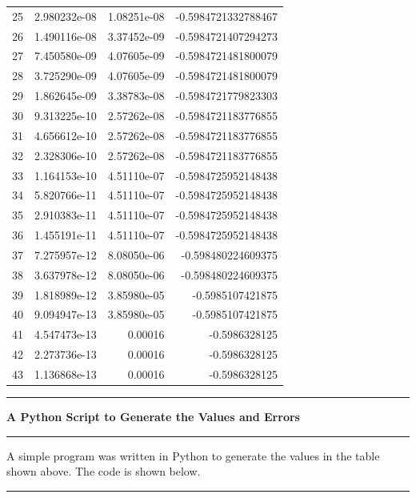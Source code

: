 \documentclass[10pt,fleqn]{article}
\begin{document}
\begin{tabular}{r|r|r|r|}
  25 &  2.980232e-08 & 1.08251e-08 &  -0.5984721332788467  \\
  26 &  1.490116e-08 & 3.37452e-09 &  -0.5984721407294273  \\
  27 &  7.450580e-09 & 4.07605e-09 &  -0.5984721481800079  \\
  28 &  3.725290e-09 & 4.07605e-09 &  -0.5984721481800079  \\
  29 &  1.862645e-09 & 3.38783e-08 &  -0.5984721779823303  \\
  30 &  9.313225e-10 & 2.57262e-08 &  -0.5984721183776855  \\
  31 &  4.656612e-10 & 2.57262e-08 &  -0.5984721183776855  \\
  32 &  2.328306e-10 & 2.57262e-08 &  -0.5984721183776855  \\
  33 &  1.164153e-10 & 4.51110e-07 &  -0.5984725952148438  \\
  34 &  5.820766e-11 & 4.51110e-07 &  -0.5984725952148438  \\
  35 &  2.910383e-11 & 4.51110e-07 &  -0.5984725952148438  \\
  36 &  1.455191e-11 & 4.51110e-07 &  -0.5984725952148438  \\
  37 &  7.275957e-12 & 8.08050e-06 &  -0.598480224609375   \\
  38 &  3.637978e-12 & 8.08050e-06 &  -0.598480224609375   \\
  39 &  1.818989e-12 & 3.85980e-05 &  -0.5985107421875     \\
  40 &  9.094947e-13 & 3.85980e-05 &  -0.5985107421875     \\
  41 &  4.547473e-13 & 0.00016     &  -0.5986328125        \\
  42 &  2.273736e-13 & 0.00016     &  -0.5986328125        \\
  43 &  1.136868e-13 & 0.00016     &  -0.5986328125        \\
\hline
\end{tabular}
\vskip0.1in\hrule\vskip0.1in \noindent
{\bf A Python Script to Generate the Values and Errors}
\vskip0.1in\hrule\vskip0.1in \noindent
A simple program was written in Python to generate the values in the table shown
above. The code is shown below.
\vskip0.1in\hrule\vskip0.1in
\end{document}
